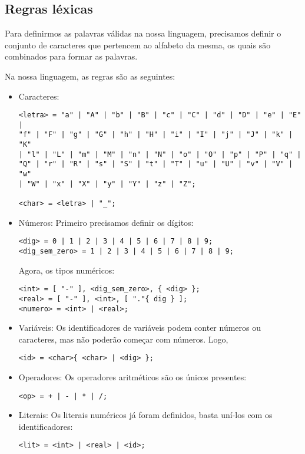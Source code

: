 \documentclass[a4 paper, 12pt]{article}
\begin{document}
\subsection{Regras l\'exicas}

Para definirmos as palavras v\'alidas na nossa linguagem, precisamos
definir o conjunto de caracteres que pertencem ao alfabeto da mesma,
os quais s\~ao combinados para formar as palavras.

Na nossa linguagem, as regras s\~ao as seguintes:
\begin{itemize}
\item Caracteres:
\begin{verbatim}
<letra> = "a" | "A" | "b" | "B" | "c" | "C" | "d" | "D" | "e" | "E" |
"f" | "F" | "g" | "G" | "h" | "H" | "i" | "I" | "j" | "J" | "k" | "K"
| "l" | "L" | "m" | "M" | "n" | "N" | "o" | "O" | "p" | "P" | "q" |
"Q" | "r" | "R" | "s" | "S" | "t" | "T" | "u" | "U" | "v" | "V" | "w"
| "W" | "x" | "X" | "y" | "Y" | "z" | "Z";

<char> = <letra> | "_";
\end{verbatim}

\item N\'umeros:
Primeiro precisamos definir os d\'igitos:
\begin{verbatim}
<dig> = 0 | 1 | 2 | 3 | 4 | 5 | 6 | 7 | 8 | 9;
<dig_sem_zero> = 1 | 2 | 3 | 4 | 5 | 6 | 7 | 8 | 9;
\end{verbatim}

Agora, os tipos num\'ericos:

\begin{verbatim}
<int> = [ "-" ], <dig_sem_zero>, { <dig> };
<real> = [ "-" ], <int>, [ "."{ dig } ];
<numero> = <int> | <real>;
\end{verbatim}

\item Vari\'aveis:
Os identificadores de vari\'aveis podem conter n\'umeros ou
caracteres, mas n\~ao poder\~ao come\c car com n\'umeros. Logo,
\begin{verbatim}
<id> = <char>{ <char> | <dig> };
\end{verbatim}

\item Operadores:
Os operadores aritm\'eticos s\~ao os \'unicos presentes:
\begin{verbatim}
<op> = + | - | * | /;
\end{verbatim}

\item Literais:
Os literais num\'ericos j\'a foram definidos, basta un\'i-los com os
identificadores:
\begin{verbatim}
<lit> = <int> | <real> | <id>;
\end{verbatim}
\end{itemize}
\end{document}
